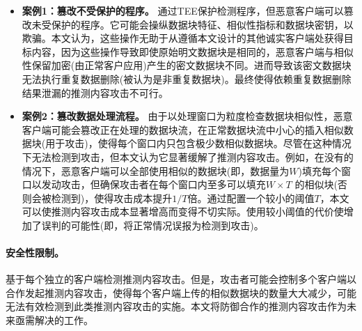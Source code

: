 \begin{itemize}[leftmargin=0em]
  \item \textbf{案例1：篡改不受保护的程序。}
        \sysnameF 通过TEE保护检测程序，但恶意客户端可以篡改未受保护的程序。它可能会操纵数据块特征、相似性指标和数据块密钥，以欺骗\sysnameF。本文认为，这些操作无助于从遵循本文设计的其他诚实客户端处获得目标内容，因为这些操作导致即使原始明文数据块是相同的，恶意客户端与相似性保留加密(由正常客户应用)产生的密文数据块不同。进而导致该密文数据块无法执行重复数据删除(被认为是非重复数据块)。最终使得依赖重复数据删除结果泄漏的推测内容攻击不可行。
  \item \textbf{案例2：篡改数据处理流程。}
        由于\sysnameF 以处理窗口为粒度检查数据块相似性，恶意客户端可能会篡改正在处理的数据块流，在正常数据块流中小心的插入相似数据块(用于攻击)，使得每个窗口内只包含极少数相似数据块。尽管\sysnameF 在这种情况下无法检测到攻击，但本文认为它显著缓解了推测内容攻击。例如，在没有\sysnameF 的情况下，恶意客户端可以全部使用相似的数据块(即，数据量为$W$)填充每个窗口以发动攻击，但\sysnameF 确保攻击者在每个窗口内至多可以填充$W\times T$ 的相似块(否则会被检测到)，使得攻击成本提升$1/T$倍。通过配置一个较小的阈值$T$，本文可以使推测内容攻击成本显著增高而变得不切实际。使用较小阈值的代价使增加了误判的可能性(即，将正常情况误报为检测到攻击)。
\end{itemize}

\paragraph*{安全性限制。}\sysnameF 基于每个独立的客户端检测推测内容攻击。但是，攻击者可能会控制多个客户端以合作发起推测内容攻击，使得每个客户端上传的相似数据块的数量大大减少，\sysnameF 可能无法有效检测到此类推测内容攻击的实施。本文将防御合作的推测内容攻击作为未来亟需解决的工作。